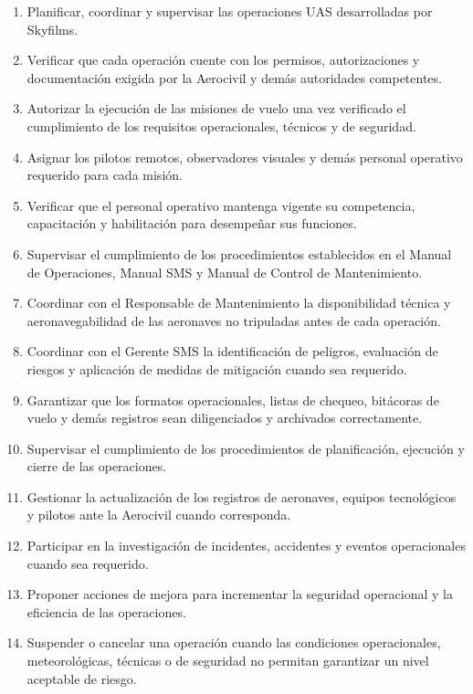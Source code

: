 \begin{enumerate}[label=\alph*)]

\item Planificar, coordinar y supervisar las operaciones UAS desarrolladas por Skyfilms.

\item Verificar que cada operación cuente con los permisos, autorizaciones y documentación exigida por la Aerocivil y demás autoridades competentes.

\item Autorizar la ejecución de las misiones de vuelo una vez verificado el cumplimiento de los requisitos operacionales, técnicos y de seguridad.

\item Asignar los pilotos remotos, observadores visuales y demás personal operativo requerido para cada misión.

\item Verificar que el personal operativo mantenga vigente su competencia, capacitación y habilitación para desempeñar sus funciones.

\item Supervisar el cumplimiento de los procedimientos establecidos en el Manual de Operaciones, Manual SMS y Manual de Control de Mantenimiento.

\item Coordinar con el Responsable de Mantenimiento la disponibilidad técnica y aeronavegabilidad de las aeronaves no tripuladas antes de cada operación.

\item Coordinar con el Gerente SMS la identificación de peligros, evaluación de riesgos y aplicación de medidas de mitigación cuando sea requerido.

\item Garantizar que los formatos operacionales, listas de chequeo, bitácoras de vuelo y demás registros sean diligenciados y archivados correctamente.

\item Supervisar el cumplimiento de los procedimientos de planificación, ejecución y cierre de las operaciones.

\item Gestionar la actualización de los registros de aeronaves, equipos tecnológicos y pilotos ante la Aerocivil cuando corresponda.

\item Participar en la investigación de incidentes, accidentes y eventos operacionales cuando sea requerido.

\item Proponer acciones de mejora para incrementar la seguridad operacional y la eficiencia de las operaciones.

\item Suspender o cancelar una operación cuando las condiciones operacionales, meteorológicas, técnicas o de seguridad no permitan garantizar un nivel aceptable de riesgo.

\end{enumerate}

